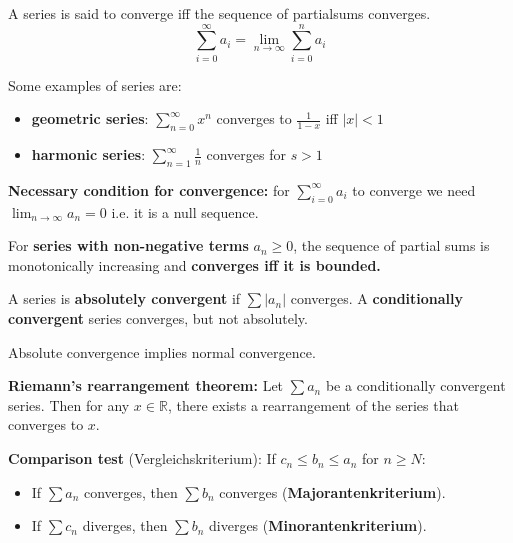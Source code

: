 \begin{definition}
    A series is said to converge iff the sequence of partialsums converges.
    $$\sum_{i=0}^\infty a_i = \lim_{n \to \infty} \sum_{i=0}^n a_i$$
\end{definition}

\begin{remark}
    Some examples of series are:
    \begin{itemize}
        \item \textbf{geometric series}: $\sum_{n=0}^\infty x^n$ converges to $\frac{1}{1-x}$ iff $|x| < 1$
        \item \textbf{harmonic series}: $\sum_{n=1}^\infty \frac{1}{n}$ converges for $s \gt 1$
    \end{itemize}
\end{remark}

\begin{theorem}
    \textbf{Necessary condition for convergence:} for $\sum_{i=0}^\infty a_i$ to converge we need $\lim_{n \to \infty} a_n = 0$ i.e. it is a null sequence.
\end{theorem}

\begin{theorem}
    For \textbf{series with non-negative terms} $a_n \ge 0$, the sequence of partial sums is monotonically increasing and \textbf{converges iff it is bounded.}
\end{theorem}

\begin{definition}
    A series is \textbf{absolutely convergent} if $\sum |a_n|$ converges. A \textbf{conditionally convergent} series converges, but not absolutely.
\end{definition}

\begin{remark}
    Absolute convergence implies normal convergence.
\end{remark}

\begin{theorem}
    \textbf{Riemann's rearrangement theorem:}
    Let $\sum a_n$ be a conditionally convergent series. Then for any $x \in \mathbb{R}$, there exists a rearrangement of the series that converges to $x$.
\end{theorem}

\begin{theorem}
    \textbf{Comparison test} (Vergleichskriterium): If $c_n \le b_n \le a_n$ for $n \ge N$:
    \begin{itemize}
        \item If $\sum a_n$ converges, then $\sum b_n$ converges (\textbf{Majorantenkriterium}).
        \item If $\sum c_n$ diverges, then $\sum b_n$ diverges (\textbf{Minorantenkriterium}).
    \end{itemize}
\end{theorem}

